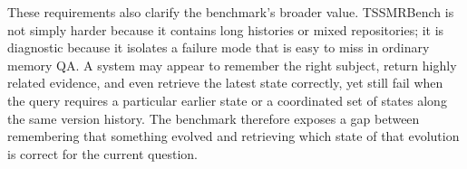 These requirements also clarify the benchmark's broader value. TSSMRBench is not simply harder because it contains long histories or mixed repositories; it is diagnostic because it isolates a failure mode that is easy to miss in ordinary memory QA. A system may appear to remember the right subject, return highly related evidence, and even retrieve the latest state correctly, yet still fail when the query requires a particular earlier state or a coordinated set of states along the same version history. The benchmark therefore exposes a gap between remembering that something evolved and retrieving which state of that evolution is correct for the current question.


